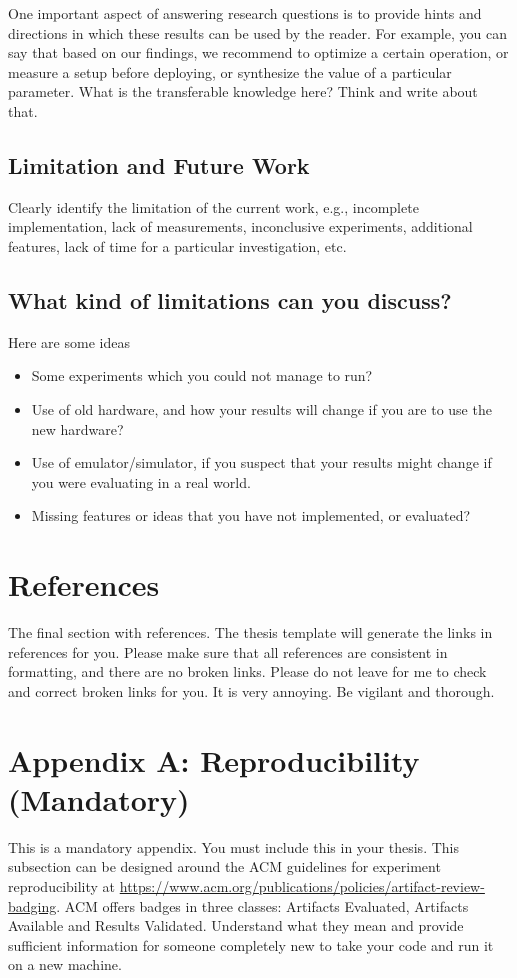\documentclass[11pt]{article}
\begin{document}
One important aspect of answering research questions is to provide hints and directions in which these results can be used by the reader. For example, you can say that based on our findings, we recommend to optimize a certain operation, or measure a setup before deploying, or synthesize the value of a particular parameter. What is the transferable knowledge here? Think and write about that. 
\subsection{Limitation and Future Work}
Clearly identify the limitation of the current work, e.g., incomplete implementation, lack of measurements, inconclusive experiments, additional features, lack of time for a particular investigation, etc. 

\subsection*{What kind of limitations can you discuss?}
Here are some ideas 
\begin{itemize}
 \item Some experiments which you could not manage to run?
 \item Use of old hardware, and how your results will change if you are to use the new hardware?
 \item Use of emulator/simulator, if you suspect that your results might change if you were evaluating in a real world. 
 \item Missing features or ideas that you have not implemented, or evaluated? 
\end{itemize}

\newpage 
\section{References}
The final section with references. The thesis template will generate the links in references for you. Please make sure that all references are consistent in formatting, and there are no broken links. Please do not leave for me to check and correct broken links for you. It is very annoying. Be vigilant and thorough. 

\newpage 
\section*{Appendix A: Reproducibility (Mandatory)}
This is a mandatory appendix. You must include this in your thesis. This subsection can be designed around the ACM guidelines for experiment reproducibility at \url{https://www.acm.org/publications/policies/artifact-review-badging}. ACM offers badges in three classes: Artifacts Evaluated, Artifacts Available and Results Validated. Understand what they mean and provide sufficient information for someone completely new to take your code and run it on a new machine.  
\end{document}
